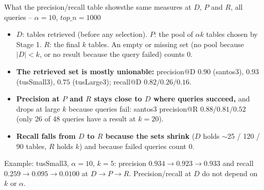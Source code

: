 \documentclass[aspectratio=169,10pt]{beamer}
\newcommand{\highlight}[1]{{\color{Cat1}\bfseries #1}}
\begin{document}
\begin{frame}{What the precision/recall table shows}{the same measures at $D$, $P$ and $R$, all queries -- $\alpha{=}10$, $top\_n{=}1000$}
\small
\begin{itemize}\setlength\itemsep{4pt}
\item $D$: tables retrieved (before any selection). $P$: the pool of $\alpha k$ tables chosen by Stage 1. $R$: the final $k$ tables. An empty or missing set (no pool because $|D|{<}k$, or no result because the query failed) counts 0.
\item \highlight{The retrieved set is mostly unionable:} precision@D $0.90$ (santos3), $0.93$ (tusSmall3), $0.75$ (tusLarge3); recall@D $0.82/0.26/0.16$.
\item \highlight{Precision at $P$ and $R$ stays close to $D$ where queries succeed,} and drops at large $k$ because queries fail: santos3 precision@R $0.88/0.81/0.52$ (only 26 of 48 queries have a result at $k{=}20$).
\item \highlight{Recall falls from $D$ to $R$ because the sets shrink} ($D$ holds $\sim$25 / 120 / 90 tables, $R$ holds $k$) and because failed queries count 0.
\end{itemize}
\vspace{2pt}
{\footnotesize\color{Muted} Example: tusSmall3, $\alpha{=}10$, $k{=}5$: precision $0.934\to0.923\to0.933$ and recall $0.259\to0.095\to0.0100$ at $D\to P\to R$. Precision/recall at $D$ do not depend on $k$ or $\alpha$.}
\end{frame}
\end{document}

